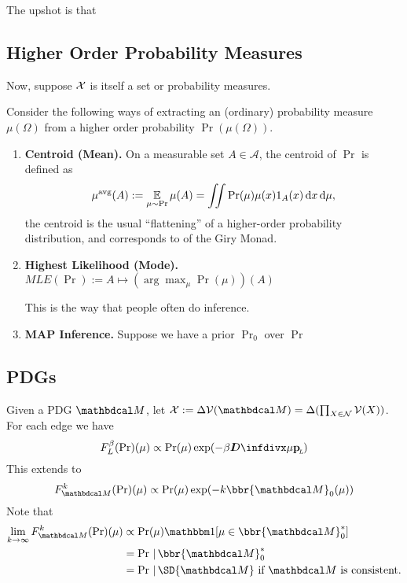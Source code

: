 \documentclass{article}
\begin{document}
The upshot is that


\subsection{Higher Order Probability Measures}
Now, suppose $\mathcal X$ is itself a set or probability measures.



Consider the following ways of extracting an (ordinary) probability measure $\mu(\Omega)$
from a higher order probability $\Pr(\mu(\Omega))$.

\begin{enumerate}
    \item \textbf{Centroid (Mean).}
        On a measurable set $A \in \mathcal A$, the centroid of $\Pr$ is defined as
        \[
            \mu^{\text{avg}}(A) := \operatorname*{\mathbb{E}}_{\mu \sim \Pr} \mu(A) =
                \iint \Pr(\mu) \mu(x) 1_{A}(x)\, \mathrm d x\,\mathrm d\mu,
        \]
        the centroid is the usual ``flattening'' of a higher-order probability distribution, and corresponds to
        of the Giry Monad.

    \item \textbf{Highest Likelihood (Mode).}
        $\textit{MLE}(\Pr) := A \mapsto (\arg\max_\mu \Pr(\mu))(A)$

        This is the way that people often do inference.

    \item \textbf{MAP Inference.}
        Suppose we have a prior $\Pr_0$ over  $\Pr$

\end{enumerate}


\subsection{PDGs}

Given a PDG $\dg M$, let $\X := \Delta\V(\dg M) = \Delta(\prod_{X\in\N}\V(X))$. For each edge we have
\[
    F_L^{\beta}(\Pr) (\mu) \propto \Pr(\mu) \exp(-\beta \kldiv\mu \bp)
\]
This extends to
\[
    F_{\dg M}^k(\Pr)(\mu) \propto \Pr(\mu) \exp(- k \bbr{\dg M}_0(\mu))
\]
Note that
\begin{align*}
    \lim_{k \to \infty} F_{\dg M}^k(\Pr)(\mu) &\propto
        \Pr(\mu) \mathbbm1[\mu \in {\bbr{\dg M}^*_0}] \\
        &= \Pr \,|\, \bbr{\dg M}^*_0 \\
        &= \Pr \,|\, \SD{\dg M} \text{~if $\dg M$ is consistent.}
\end{align*}
\end{document}
